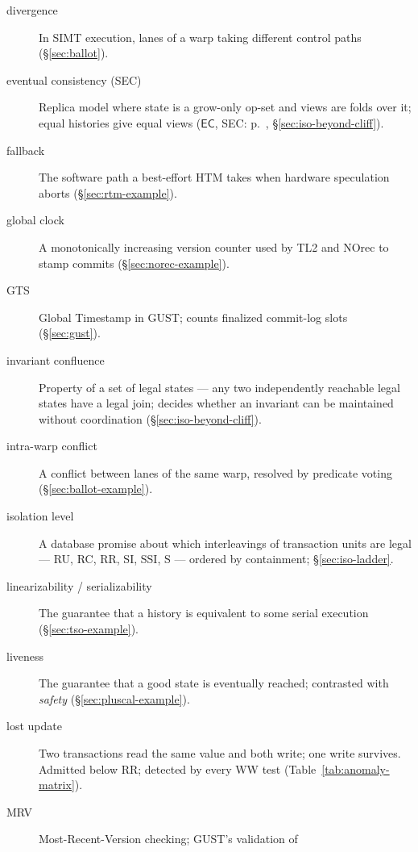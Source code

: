 \begin{description}
    \item[divergence]  In SIMT execution, lanes of a warp
          taking different control paths (\S\ref{sec:ballot}).
    \item[eventual consistency (SEC)]  Replica model where state is a grow-only op-set and views are folds over it; equal histories give equal views ($\mathsf{EC}$, \textsf{SEC}: p.~\pageref{cha:notation}, \S\ref{sec:iso-beyond-cliff}).
    \item[fallback]  The software path a best-effort HTM takes
          when hardware speculation aborts (\S\ref{sec:rtm-example}).
    \item[global clock]  A monotonically increasing
          version counter used by TL2 and NOrec to stamp commits
          (\S\ref{sec:norec-example}).
    \item[GTS]  Global Timestamp in GUST; counts finalized commit-log
          slots (\S\ref{sec:gust}).
    \item[invariant confluence]  Property of a set
          of legal states --- any two independently reachable legal states
          have a legal join; decides whether an invariant can be maintained
          without coordination \cite{bailis14confluence}
          (\S\ref{sec:iso-beyond-cliff}).
    \item[intra-warp conflict]  A conflict between
          lanes of the same warp, resolved by predicate voting
          (\S\ref{sec:ballot-example}).
    \item[isolation level]  A database promise about which interleavings of transaction units are legal --- RU, RC, RR, SI, SSI, S --- ordered by containment; \S\ref{sec:iso-ladder}.
    \item[linearizability / serializability]  The
          guarantee that a history is equivalent to some serial execution
          (\S\ref{sec:tso-example}).
    \item[liveness]  The guarantee that a good state is
          eventually reached; contrasted with \emph{safety}
          (\S\ref{sec:pluscal-example}).
    \item[lost update]  Two transactions read the same value and both write; one write survives. Admitted below RR; detected by every WW test (Table~\ref{tab:anomaly-matrix}).
    \item[MRV]  Most-Recent-Version checking; GUST's validation of

\end{description}
